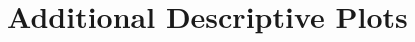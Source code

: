 \documentclass[12pt]{article}
\begin{document}
\section{Additional Descriptive Plots}\label{app:desc}
\renewcommand\thefigure{\thesection.\arabic{figure}}
\renewcommand\thetable{\thesection.\arabic{table}}
\setcounter{figure}{0}
\setcounter{table}{0}

%
%
%
%
%
\end{document}
